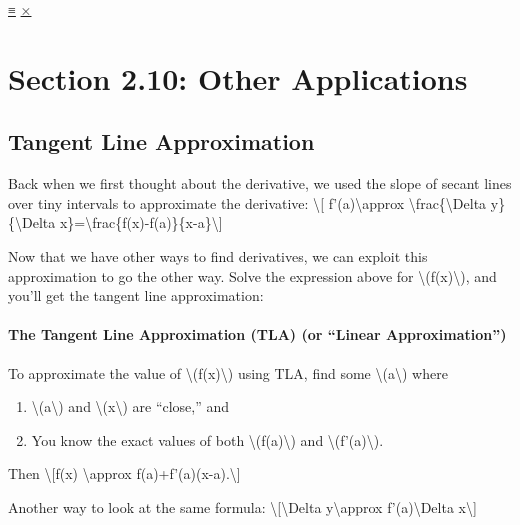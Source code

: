 \protect\hyperlink{main-nav}{≡} \protect\hyperlink{close-nav}{×}

\hypertarget{section-2.10-other-applications}{%
\section{Section 2.10: Other
Applications}\label{section-2.10-other-applications}}

\hypertarget{tangent-line-approximation}{%
\subsection{Tangent Line
Approximation}\label{tangent-line-approximation}}

Back when we first thought about the derivative, we used the slope of
secant lines over tiny intervals to approximate the derivative:
\textbackslash{}{[} f'(a)\textbackslash{}approx
\textbackslash{}frac\{\textbackslash{}Delta y\}\{\textbackslash{}Delta
x\}=\textbackslash{}frac\{f(x)-f(a)\}\{x-a\}\textbackslash{}{]}

Now that we have other ways to find derivatives, we can exploit this
approximation to go the other way. Solve the expression above for
\textbackslash{}(f(x)\textbackslash{}), and you'll get the tangent line
approximation:

\hypertarget{the-tangent-line-approximation-tla-or-linear-approximation}{%
\paragraph{The Tangent Line Approximation (TLA) (or ``Linear
Approximation'')}\label{the-tangent-line-approximation-tla-or-linear-approximation}}

To approximate the value of \textbackslash{}(f(x)\textbackslash{}) using
TLA, find some \textbackslash{}(a\textbackslash{}) where

\begin{enumerate}
\tightlist
\item
  \textbackslash{}(a\textbackslash{}) and
  \textbackslash{}(x\textbackslash{}) are ``close,'' and
\item
  You know the exact values of both
  \textbackslash{}(f(a)\textbackslash{}) and
  \textbackslash{}(f'(a)\textbackslash{}).
\end{enumerate}

Then \textbackslash{}{[}f(x) \textbackslash{}approx
f(a)+f'(a)(x-a).\textbackslash{}{]}

Another way to look at the same formula:
\textbackslash{}{[}\textbackslash{}Delta y\textbackslash{}approx
f'(a)\textbackslash{}Delta x\textbackslash{}{]}

